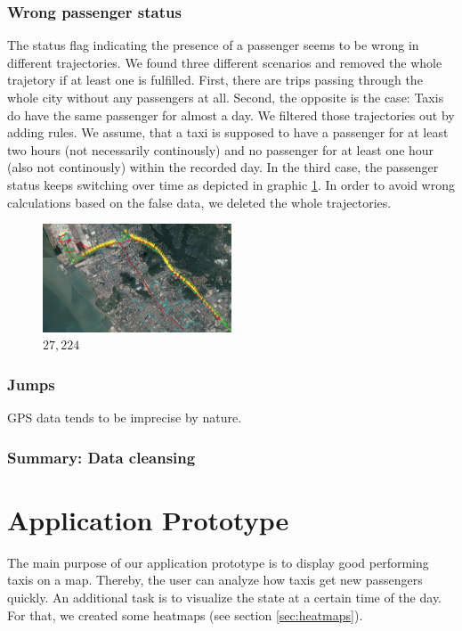\documentclass[10pt]{sig-alternate}
\begin{document}
\subsubsection{Wrong passenger status}
The status flag indicating the presence of a passenger seems to be wrong in different trajectories. We found three different scenarios and removed the whole trajetory if at least one is fulfilled. First, there are trips passing through the whole city without any passengers at all. Second, the opposite is the case: Taxis do have the same passenger for almost a day. We filtered those trajectories out by adding rules. We assume, that a taxi is supposed to have a passenger for at least two hours (not necessarily continously) and no passenger for at least one hour (also not continously) within the recorded day. In the third case, the passenger status keeps switching over time as depicted in graphic \ref{fig:passenger_status}. In order to avoid wrong calculations based on the false data, we deleted the whole trajectories.


\begin{figure}[ht]
\centering
\includegraphics[width=0.5\textwidth]{img/passenger_status.png}
\caption{$27,224$}
\label{fig:passenger_status}
\end{figure}


\subsubsection{Jumps}
GPS data tends to be imprecise by nature. 
\subsubsection{Summary: Data cleansing}

\section{Application Prototype}

The main purpose of our application prototype is to display good performing taxis on a map. Thereby, the user can analyze how taxis get new passengers quickly. An additional task is to visualize the state at a certain time of the day. For that, we created some heatmaps (see section \ref{sec:heatmaps}).
\end{document}
